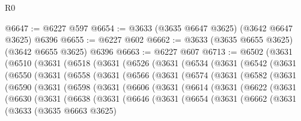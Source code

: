 \begin{lexlean}{R0}
\begin{coremodule}
@6647 := @6227 @597
@6654 := @3633 (@3635 @6647 @3625) (@3642 @6647 @3625) @6396
@6655 := @6227 @602
@6662 := @3633 (@3635 @6655 @3625) (@3642 @6655 @3625) @6396
@6663 := @6227 @607
@6713 := @6502
    (@3631
      (@6510
        (@3631
          (@6518
            (@3631
              (@6526
                (@3631
                  (@6534
                    (@3631
                      (@6542
                        (@3631
                          (@6550
                            (@3631
                              (@6558
                                (@3631
                                  (@6566
                                    (@3631
                                      (@6574
                                        (@3631
                                          (@6582
                                            (@3631
                                              (@6590
                                                (@3631
                                                  (@6598
                                                    (@3631
                                                      (@6606
                                                        (@3631
                                                          (@6614
                                                            (@3631
                                                              (@6622
                                                                (@3631
                                                                  (@6630
                                                                    (@3631
                                                                      (@6638
                                                                        (@3631
                                                                          (@6646
                                                                            (@3631
                                                                              (@6654
                                                                                (@3631
                                                                                  (@6662
                                                                                    (@3631
                                                                                      (@3633
                                                                                        (@3635
                                                                                          @6663
                                                                                          @3625)

\end{coremodule}
\end{lexlean}
